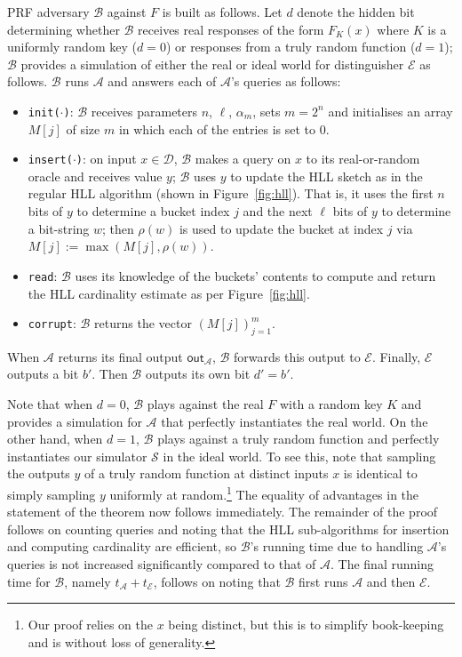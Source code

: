 \documentclass[sigconf, anonymous, dvipsnames]{acmart} %
\begin{document}
PRF adversary ${{\mathcal{B}}}$ against $F$ is built as follows. Let $d$ denote the hidden bit determining whether ${{\mathcal{B}}}$ receives real responses of the form $F_K(x)$ where $K$ is a uniformly random key ($d=0$) or responses from a truly random function ($d=1$); ${{\mathcal{B}}}$ provides a simulation of either the real or ideal world for distinguisher ${\mathcal{E}}$ as follows. ${{\mathcal{B}}}$ runs ${{\mathcal{A}}}$ and answers each of ${{\mathcal{A}}}$'s queries as follows:
\begin{itemize}
\item \texttt{init($\cdot$)}: ${{\mathcal{B}}}$ receives parameters $n$, $\ell$, $\alpha_m$, sets $m=2^n$ and initialises an array $M[j]$ of size $m$ in which each of the entries is set to 0. 
\item \texttt{insert($\cdot$)}: on input $x \in {{\mathcal{D}}}$,  ${{\mathcal{B}}}$ makes a query on $x$ to its real-or-random oracle and receives value $y$; ${{\mathcal{B}}}$ uses $y$ to update the HLL sketch as in the regular HLL algorithm (shown in Figure~\ref{fig:hll}). That is, it uses the first $n$ bits of $y$ to determine a bucket index $j$ and the next $\ell$ bits of $y$ to determine a bit-string $w$; then $\rho(w)$ is used to update the bucket at index $j$ via $M[j]:= \max(M[j],\rho(w))$.
\item \texttt{read}: ${{\mathcal{B}}}$ uses its knowledge of the buckets' contents to compute and return the HLL cardinality estimate as per Figure~\ref{fig:hll}. 
\item \texttt{corrupt}: ${{\mathcal{B}}}$ returns the vector $(M[j])_{j=1}^{m}$. 
\end{itemize}
When ${\mathcal{A}}$ returns its final output $\textsf{out}_{\mathcal{A}}$, ${{\mathcal{B}}}$ forwards this output to ${{\mathcal{E}}}$. Finally, ${{\mathcal{E}}}$ outputs a bit $b'$. Then ${{\mathcal{B}}}$ outputs its own bit $d'=b'$. 

Note that when $d=0$, ${{\mathcal{B}}}$ plays against the real $F$ with a random key $K$ and provides a simulation for ${\mathcal{A}}$ that perfectly instantiates the real world. On the other hand, when $d=1$, ${{\mathcal{B}}}$ plays against a truly random function and perfectly instantiates our simulator $\mathcal{S}$ in the ideal world. To see this, note that sampling the outputs $y$ of a truly random function at distinct inputs $x$ is identical to simply sampling $y$ uniformly at random.\footnote{Our proof relies on the $x$ being distinct, but this is to simplify book-keeping and is without loss of generality.} The equality of advantages in the statement of the theorem now follows immediately. The remainder of the proof follows on counting queries and noting that the HLL sub-algorithms for insertion and computing cardinality are efficient, so ${{\mathcal{B}}}$'s running time due to handling ${\mathcal{A}}$'s queries is not increased significantly compared to that of ${\mathcal{A}}$. The final running time for ${\mathcal{B}}$, namely $t_{\mathcal{A}}+t_{\mathcal{E}}$, follows on noting that ${\mathcal{B}}$ first runs ${\mathcal{A}}$ and then ${\mathcal{E}}$.
\end{document}
